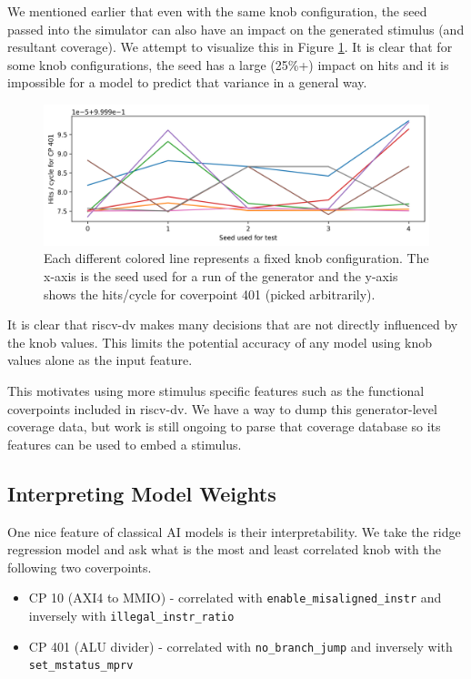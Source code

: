 \documentclass[sigconf,noacm]{acmart}
\begin{document}
We mentioned earlier that even with the same knob configuration, the seed passed into the simulator can also have an impact on the generated stimulus (and resultant coverage).
We attempt to visualize this in Figure \ref{fig:variance}.
It is clear that for some knob configurations, the seed has a large (25\%+) impact on hits and it is impossible for a model to predict that variance in a general way.

\begin{figure}
  \includegraphics[width=\linewidth]{figs/variance2.png}
  \caption{Each different colored line represents a fixed knob configuration. The x-axis is the seed used for a run of the generator and the y-axis shows the hits/cycle for coverpoint 401 (picked arbitrarily).}
  \label{fig:variance}
\end{figure}

It is clear that riscv-dv makes many decisions that are not directly influenced by the knob values.
This limits the potential accuracy of any model using knob values alone as the input feature.

This motivates using more stimulus specific features such as the functional coverpoints included in riscv-dv.
We have a way to dump this generator-level coverage data, but work is still ongoing to parse that coverage database so its features can be used to embed a stimulus.

\subsection{Interpreting Model Weights}

One nice feature of classical AI models is their interpretability.
We take the ridge regression model and ask what is the most and least correlated knob with the following two coverpoints.

\begin{itemize}
  \item CP 10 (AXI4 to MMIO) - correlated with \verb|enable_misaligned_instr| and inversely with \verb|illegal_instr_ratio|
  \item CP 401 (ALU divider) - correlated with \verb|no_branch_jump| and inversely with \verb|set_mstatus_mprv|
\end{itemize}
\end{document}
